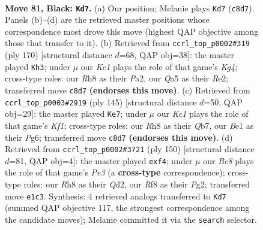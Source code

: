 \documentclass[11pt]{article}
\begin{document}
\clearpage

\begin{figure}[p]\centering
\begin{subfigure}{0.46\textwidth}\centering
\resizebox{\linewidth}{!}{%
\newchessgame
\chessboard[
  setfen={2k2r1r/p5p1/7p/q5PP/3P4/4P3/2Q4N/4b2K b - - 4 81},
  showmover=false,
  pgfstyle=straightmove, color=movearrow, markmove={c8-d7}
]}
\caption{}
\end{subfigure}\hfill
\begin{subfigure}{0.46\textwidth}\centering
\resizebox{\linewidth}{!}{%
\newchessgame
\chessboard[
  setfen={8/5k1p/1b1ppPpP/8/1P2Q1K1/p7/P3R3/6q1 w - - 9 86},
  showmover=false,
  pgfstyle=straightmove, color=movearrow, markmove={g4-h3}
]}
\caption{}
\end{subfigure}
\\[4pt]
\begin{subfigure}{0.46\textwidth}\centering
\resizebox{\linewidth}{!}{%
\newchessgame
\chessboard[
  setfen={2r2k1Q/1q3p2/4p1p1/2r1N1P1/3P4/6K1/5P2/8 b - - 9 73},
  showmover=false,
  pgfstyle=straightmove, color=movearrow, markmove={f8-e7}
]}
\caption{}
\end{subfigure}\hfill
\begin{subfigure}{0.46\textwidth}\centering
\resizebox{\linewidth}{!}{%
\newchessgame
\chessboard[
  setfen={r7/5ppk/3Rp3/2q1P3/5pK1/4P2P/3Q2P1/8 w - - 0 76},
  showmover=false,
  pgfstyle=straightmove, color=movearrow, markmove={e3-f4}
]}
\caption{}
\end{subfigure}
\caption{\textbf{Move 81, Black: \texttt{Kd7}.} (a) Our position; Melanie plays \texttt{Kd7} (\texttt{c8d7}). Panels (b)--(d) are the retrieved master positions whose correspondence most drove this move (highest QAP objective among those that transfer to it). (b) Retrieved from \texttt{ccrl\_top\_p0002\#319} (ply 170) [structural distance $d$=68, QAP obj=38]: the master played \texttt{Kh3}; under $\mu$ our \emph{Kc1} plays the role of that game's \emph{Kg4}; cross-type roles: our \emph{R}h8 as their \emph{P}a2, our \emph{Q}a5 as their \emph{R}e2; transferred move \texttt{c8d7} \textbf{(endorses this move)}. (c) Retrieved from \texttt{ccrl\_top\_p0003\#2919} (ply 145) [structural distance $d$=50, QAP obj=29]: the master played \texttt{Ke7}; under $\mu$ our \emph{Kc1} plays the role of that game's \emph{Kf1}; cross-type roles: our \emph{R}h8 as their \emph{Q}b7, our \emph{B}e1 as their \emph{P}g6; transferred move \texttt{c8d7} \textbf{(endorses this move)}. (d) Retrieved from \texttt{ccrl\_top\_p0002\#3721} (ply 150) [structural distance $d$=81, QAP obj=4]: the master played \texttt{exf4}; under $\mu$ our \emph{Be8} plays the role of that game's \emph{Pe3} (a \textbf{cross-type} correspondence); cross-type roles: our \emph{R}h8 as their \emph{Q}d2, our \emph{R}f8 as their \emph{P}g2; transferred move \texttt{e1c3}. Synthesis: 4 retrieved analogs transferred to \texttt{Kd7} (summed QAP objective 117, the strongest correspondence among the candidate moves); Melanie committed it via the \texttt{search} selector.}
\label{fig:thought-m161}
\end{figure}
\end{document}
